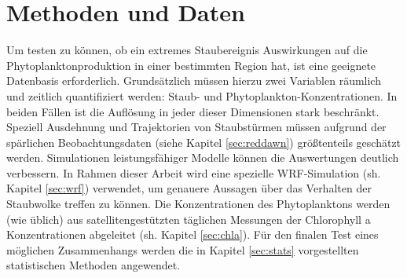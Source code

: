 \documentclass[12pt,a4paper,onecolumn]{scrartcl}
\begin{document}
\section{Methoden und Daten} \label{sec:Methoden}
Um testen zu können, ob ein extremes Staubereignis Auswirkungen auf die Phytoplanktonproduktion in einer bestimmten Region hat, ist eine geeignete Datenbasis erforderlich. Grundsätzlich müssen hierzu zwei Variablen räumlich und zeitlich quantifiziert werden: Staub- und Phytoplankton-Konzentrationen. In beiden Fällen ist die Auflösung in jeder dieser Dimensionen stark beschränkt. Speziell Ausdehnung und Trajektorien von Staubstürmen müssen aufgrund der spärlichen Beobachtungsdaten (siehe Kapitel  \ref{sec:reddawn}) größtenteils geschätzt werden. Simulationen leistungsfähiger Modelle können die Auswertungen deutlich verbessern. In Rahmen dieser Arbeit wird eine spezielle WRF-Simulation (sh. Kapitel \ref{sec:wrf}) verwendet, um genauere Aussagen über das Verhalten der Staubwolke treffen zu können. Die Konzentrationen des Phytoplanktons werden (wie üblich) aus satellitengestützten täglichen Messungen der Chlorophyll a Konzentrationen abgeleitet (sh. Kapitel \ref{sec:chla}). Für den finalen Test eines möglichen Zusammenhangs werden die in Kapitel \ref{sec:stats} vorgestellten statistischen Methoden angewendet.
\end{document}
